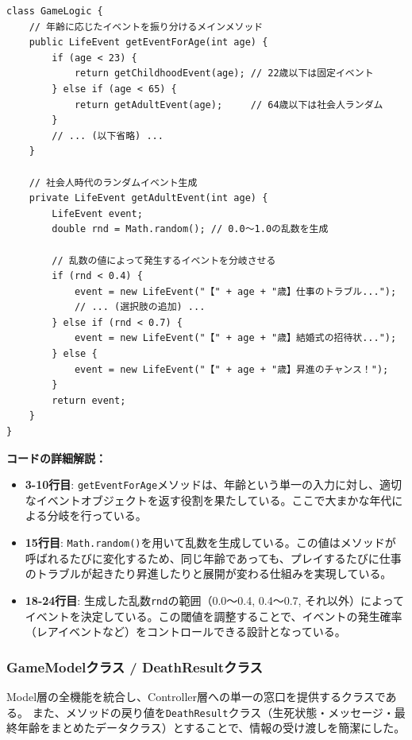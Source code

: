 \documentclass[a4paper,11pt]{jsarticle}
\begin{document}
\begin{lstlisting}[caption=GameLogic.java, label=code:logic_detail]
class GameLogic {
    // 年齢に応じたイベントを振り分けるメインメソッド
    public LifeEvent getEventForAge(int age) {
        if (age < 23) {
            return getChildhoodEvent(age); // 22歳以下は固定イベント
        } else if (age < 65) {
            return getAdultEvent(age);     // 64歳以下は社会人ランダム
        } 
        // ... (以下省略) ...
    }

    // 社会人時代のランダムイベント生成
    private LifeEvent getAdultEvent(int age) {
        LifeEvent event;
        double rnd = Math.random(); // 0.0〜1.0の乱数を生成

        // 乱数の値によって発生するイベントを分岐させる
        if (rnd < 0.4) {
            event = new LifeEvent("【" + age + "歳】仕事のトラブル...");
            // ... (選択肢の追加) ...
        } else if (rnd < 0.7) {
            event = new LifeEvent("【" + age + "歳】結婚式の招待状...");
        } else {
            event = new LifeEvent("【" + age + "歳】昇進のチャンス！");
        }
        return event;
    }
}
\end{lstlisting}

\textbf{コードの詳細解説：}
\begin{itemize}
    \item \textbf{3-10行目}: \texttt{getEventForAge}メソッドは、年齢という単一の入力に対し、適切なイベントオブジェクトを返す役割を果たしている。ここで大まかな年代による分岐を行っている。
    \item \textbf{15行目}: \texttt{Math.random()}を用いて乱数を生成している。この値はメソッドが呼ばれるたびに変化するため、同じ年齢であっても、プレイするたびに仕事のトラブルが起きたり昇進したりと展開が変わる仕組みを実現している。
    \item \textbf{18-24行目}: 生成した乱数\texttt{rnd}の範囲（0.0〜0.4, 0.4〜0.7, それ以外）によってイベントを決定している。この閾値を調整することで、イベントの発生確率（レアイベントなど）をコントロールできる設計となっている。
\end{itemize}



\subsubsection{GameModelクラス / DeathResultクラス}
Model層の全機能を統合し、Controller層への単一の窓口を提供するクラスである。
また、メソッドの戻り値を\texttt{DeathResult}クラス（生死状態・メッセージ・最終年齢をまとめたデータクラス）とすることで、情報の受け渡しを簡潔にした。
\end{document}
